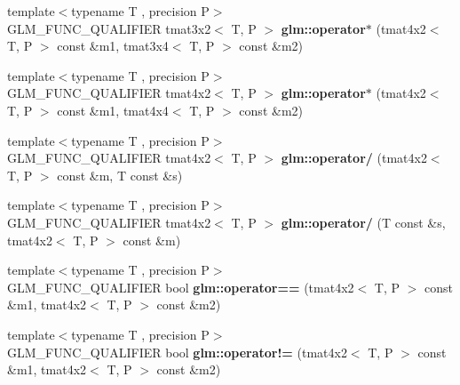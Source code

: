 \begin{DoxyCompactItemize}
\item 
\hypertarget{namespaceglm_a10dbd564c2e09836e8e6b92b755071c4}{{\footnotesize template$<$typename T , precision P$>$ }\\G\-L\-M\-\_\-\-F\-U\-N\-C\-\_\-\-Q\-U\-A\-L\-I\-F\-I\-E\-R tmat3x2$<$ T, P $>$ {\bfseries glm\-::operator$\ast$} (tmat4x2$<$ T, P $>$ const \&m1, tmat3x4$<$ T, P $>$ const \&m2)}\label{namespaceglm_a10dbd564c2e09836e8e6b92b755071c4}

\item 
\hypertarget{namespaceglm_ab6da5bbb14cd56a6a210175c7e75c8a4}{{\footnotesize template$<$typename T , precision P$>$ }\\G\-L\-M\-\_\-\-F\-U\-N\-C\-\_\-\-Q\-U\-A\-L\-I\-F\-I\-E\-R tmat4x2$<$ T, P $>$ {\bfseries glm\-::operator$\ast$} (tmat4x2$<$ T, P $>$ const \&m1, tmat4x4$<$ T, P $>$ const \&m2)}\label{namespaceglm_ab6da5bbb14cd56a6a210175c7e75c8a4}

\item 
\hypertarget{namespaceglm_affb3a385d6decce7be9c06956c1bdffc}{{\footnotesize template$<$typename T , precision P$>$ }\\G\-L\-M\-\_\-\-F\-U\-N\-C\-\_\-\-Q\-U\-A\-L\-I\-F\-I\-E\-R tmat4x2$<$ T, P $>$ {\bfseries glm\-::operator/} (tmat4x2$<$ T, P $>$ const \&m, T const \&s)}\label{namespaceglm_affb3a385d6decce7be9c06956c1bdffc}

\item 
\hypertarget{namespaceglm_a06f487068a72d3ba34ce4ebe1677b3db}{{\footnotesize template$<$typename T , precision P$>$ }\\G\-L\-M\-\_\-\-F\-U\-N\-C\-\_\-\-Q\-U\-A\-L\-I\-F\-I\-E\-R tmat4x2$<$ T, P $>$ {\bfseries glm\-::operator/} (T const \&s, tmat4x2$<$ T, P $>$ const \&m)}\label{namespaceglm_a06f487068a72d3ba34ce4ebe1677b3db}

\item 
\hypertarget{namespaceglm_ada1f939e41cfb8698776f1e46e937888}{{\footnotesize template$<$typename T , precision P$>$ }\\G\-L\-M\-\_\-\-F\-U\-N\-C\-\_\-\-Q\-U\-A\-L\-I\-F\-I\-E\-R bool {\bfseries glm\-::operator==} (tmat4x2$<$ T, P $>$ const \&m1, tmat4x2$<$ T, P $>$ const \&m2)}\label{namespaceglm_ada1f939e41cfb8698776f1e46e937888}

\item 
\hypertarget{namespaceglm_a5aa2e8081235bbd78c8d858494c582b8}{{\footnotesize template$<$typename T , precision P$>$ }\\G\-L\-M\-\_\-\-F\-U\-N\-C\-\_\-\-Q\-U\-A\-L\-I\-F\-I\-E\-R bool {\bfseries glm\-::operator!=} (tmat4x2$<$ T, P $>$ const \&m1, tmat4x2$<$ T, P $>$ const \&m2)}\label{namespaceglm_a5aa2e8081235bbd78c8d858494c582b8}

\end{DoxyCompactItemize}


